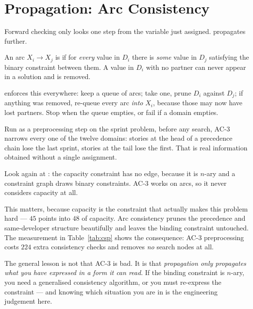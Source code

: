 \section{Propagation: Arc Consistency}
\label{sec:ac3}

Forward checking only looks one step from the variable just assigned.  propagates further.

\begin{definitionbox}
An arc $X_{i} \to X_{j}$ is  if for \emph{every} value in
$D_{i}$ there is \emph{some} value in $D_{j}$ satisfying the binary constraint
between them. A value in $D_{i}$ with no partner can never appear in a solution
and is removed.

 enforces this everywhere: keep a queue of arcs; take one, prune $D_{i}$
against $D_{j}$; if anything was removed, re-queue every arc \emph{into} $X_{i}$,
because those may now have lost partners. Stop when the queue empties, or fail if
a domain empties.
\end{definitionbox}

Run as a preprocessing step on the sprint problem, before any search, AC-3 narrows
every one of the twelve domains: stories at the head of a precedence chain lose the
last sprint, stories at the tail lose the first. That is real information obtained
without a single assignment.

\begin{alertbox}
Look again at : the capacity constraint has no edge, because it is
$n$-ary and a constraint graph draws binary constraints. AC-3 works on arcs, so it
never considers capacity at all.

This matters, because capacity is the constraint that actually makes this problem
hard --- $45$ points into $48$ of capacity. Arc consistency prunes the precedence
and same-developer structure beautifully and leaves the binding constraint
untouched. The measurement in Table~\ref{tab:csp} shows the consequence: AC-3
preprocessing costs $224$ extra consistency checks and removes \emph{no} search
nodes at all.

The general lesson is not that AC-3 is bad. It is that \emph{propagation only
propagates what you have expressed in a form it can read}. If the binding
constraint is $n$-ary, you need a generalised consistency algorithm, or you must
re-express the constraint --- and knowing which situation you are in is the
engineering judgement here.
\end{alertbox}

